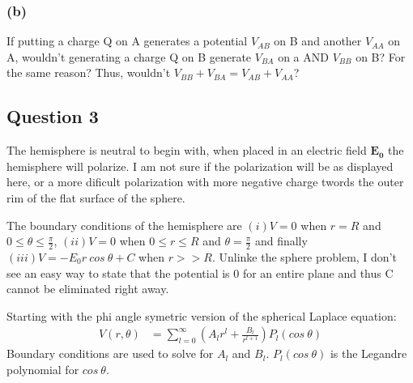 \documentclass[a4paper,12pt]{article}
\begin{document}
\subsubsection*{(b)}

If putting a charge Q on A generates a potential $V_{AB}$ on B and
another $V_{AA}$ on A, wouldn't generating a charge Q on B generate
$V_{BA}$ on a AND $V_{BB}$ on B?  For the same reason?  Thus, wouldn't $V_{BB}+V_{BA}=V_{AB}+V_{AA}$?

\subsection*{Question 3}

The hemisphere is neutral to begin with, when placed in an electric
field $\mathbf{E_0}$ the hemisphere will polarize.  I am not sure if
the polarization will be as displayed here, or a more dificult
polarization with more negative charge twords the outer rim of the
flat surface of the sphere.


The boundary conditions of the hemisphere are $(i)V=0$ when $r=R$
and $0\le\theta\le\frac{\pi}{2}$, $(ii)V=0$ when $0\le r\le R$ and
$\theta=\frac{\pi}{2}$ and finally $(iii)V=-E_0r\ cos\ \theta+ C$ when
$r>>R$.  Unlinke the sphere
problem, I don't see an easy way to state that the potential is 0 for
an entire plane and thus C cannot be eliminated right away.

Starting with the phi angle symetric version of the spherical Laplace
equation:
\begin{align}
V(r,\theta)&=\sum\limits_{l=0}^\infty(A_lr^l+\frac{B_l}{r^{l+1}})P_l(cos\ \theta)
\end{align} Boundary conditions are used to solve for $A_l$ and $B_l$.
$P_l(cos\ \theta)$ is the Legandre polynomial for $cos\ \theta$.
\end{document}
